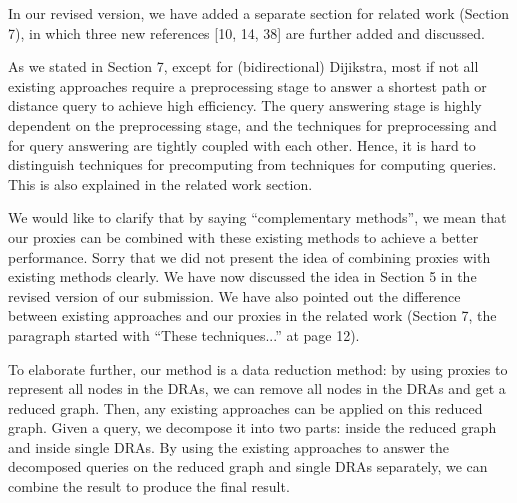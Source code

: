 \documentclass[11pt]{letter}
\newcommand{\vs}{\vspace{1ex}}
\newcommand{\svs}{\vspace{0.36ex}}
\begin{document}
In our revised version, we have added a separate section for related work (Section 7), in which three new references [10, 14, 38] are further added and discussed.

As we stated in Section 7, except for (bidirectional) Dijikstra, most if not all existing approaches require a preprocessing stage to answer a shortest path or distance query to achieve high efficiency. The query answering stage is highly dependent on the preprocessing stage, and the techniques for preprocessing and for query answering are tightly coupled with each other. Hence, it is hard to distinguish  techniques for precomputing from techniques for computing queries. This is also explained in the related work section.


\vs{}
\svs

We would like to clarify that by saying ``complementary methods'', we mean that our proxies can be combined with these existing methods to achieve a better performance. Sorry that we did not present the idea of combining proxies with existing methods clearly. We have now discussed the idea in Section 5 in the revised version of our submission. We have also pointed out the difference between existing approaches and our proxies in the related work (Section 7, the paragraph started with ``These techniques...'' at page 12).

To elaborate further, our method is a data reduction method: by using proxies to represent all nodes in the DRAs, we can remove all nodes in the DRAs and get a reduced graph. Then, any existing approaches can be applied on this reduced graph. Given a query, we decompose it into two parts: inside the reduced graph and inside single DRAs. By using the existing approaches to answer the decomposed queries on the reduced graph and single DRAs separately, we can combine the result to produce the final result.
\end{document}
